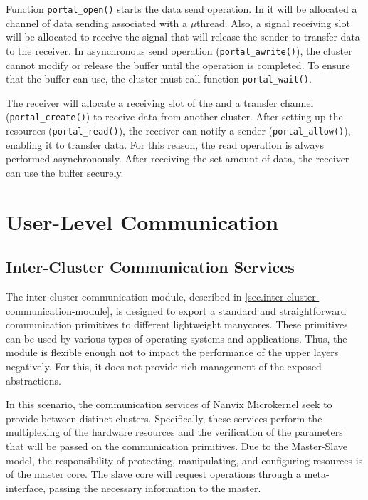 				Function \texttt{portal\_open()} starts the data send operation.
				In it will be allocated a channel of data sending associated with
				a $\mu$thread.
				Also, a signal receiving slot will be allocated to receive the
				signal that will release the sender to transfer data to the receiver.
				In asynchronous send operation (\texttt{portal\_awrite()}), the cluster
				cannot modify or release the buffer until the operation is completed.
				To ensure that the buffer can use, the cluster must call function \texttt{portal\_wait()}.

				The receiver will allocate a receiving slot of the \dnoc and a transfer
				channel (\texttt{portal\_create()}) to receive data from another cluster.
				After setting up the resources (\texttt{portal\_read()}), the receiver
				can notify a sender (\texttt{portal\_allow()}), enabling it to transfer data.
				For this reason, the read operation is always performed asynchronously.
				After receiving the set amount of data, the receiver can use the buffer securely.

	
	\section{User-Level Communication}
	\label{sec.comm-services}

		\subsection{Inter-Cluster Communication Services}
		\label{sec.inter-cluster-communication-module}

			The inter-cluster communication module, described in \autoref{sec.inter-cluster-communication-module},
			is designed to export a standard and straightforward communication
			primitives to different lightweight manycores.
			These primitives can be used by various types of operating systems
			and applications.
			Thus, the module is flexible enough not to impact the performance
			of the upper layers negatively.
			For this, it does not provide rich management of the exposed abstractions.

			In this scenario, the communication services of Nanvix Microkernel seek
			to provide \ipc between distinct clusters.
			Specifically, these services perform the multiplexing of the hardware
			resources and the verification of the parameters that will be passed
			on the communication primitives.
			Due to the Master-Slave model, the responsibility of protecting,
			manipulating, and configuring \hal resources is of the master core.
			The slave core will request operations through a meta-interface,
			passing the necessary information to the master.

